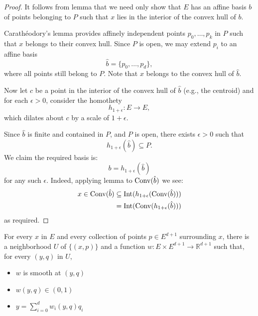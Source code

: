 \begin{proof}
  \leanok
  It follows from lemma  that we need only show that $E$
  has an affine basis $b$ of points belonging to $P$ such that $x$ lies in
  the interior of the convex hull of $b$.

  Carathéodory's lemma  provides affinely independent
  points $p_0, \dots, p_k$ in $P$ such that $x$ belongs to their convex
  hull. Since $P$ is open, we may extend $p_i$ to an affine basis
  \[
    \hat b = \{p_0, \ldots, p_d\},
  \]
  where all points still belong to $P$.
  Note that $x$ belongs to the convex hull of $\hat b$.

  Now let $c$ be a point in the interior of the convex hull of $\hat b$
  (e.g., the centroid) and for each $\epsilon > 0$, consider the homothety
  \[
    h_{1+\epsilon} : E \to E,
  \]
  which dilates about $c$ by a scale of $1 + \epsilon$.

  Since $\hat b$ is finite and contained in $P$, and $P$ is open, there exists
  $\epsilon > 0$ such that
  \[
    h_{1+\epsilon} (\hat b) \subseteq P.
  \]
  We claim the required basis is:
  \[
    b = h_{1+\epsilon} (\hat b)
  \]
  for any such $\epsilon$. Indeed, applying
  lemma  to $\operatorname{Conv}(\hat b)$ we see:
  \begin{align*}
    x \in \operatorname{Conv}(\hat b) &\subseteq \operatorname{Int} (h_{1+\epsilon} (\operatorname{Conv}(\hat b)))\\
                  &= \operatorname{Int} (\operatorname{Conv}(h_{1+\epsilon} (\hat b)))
  \end{align*}
  as required.
\end{proof}


\begin{lemma}
  \label{lem:smooth_barycentric_coord}
  For every $x$ in $E$ and every collection of points $p ∈ E^{d+1}$
  surrounding $x$, there is a neighborhood $U$ of $\{(x, p)\}$
  and a function $w : E × E^{d+1} → ℝ^{d+1}$ such that, for every
  $(y, q)$ in $U$,
  \begin{itemize}
    \item
      $w$ is smooth at $(y, q)$
    \item
      $w(y, q) ∈ (0, 1)$
    \item
      $y = \sum_{i=0}^d w_i(y, q)q_i$
  \end{itemize}
\end{lemma}

